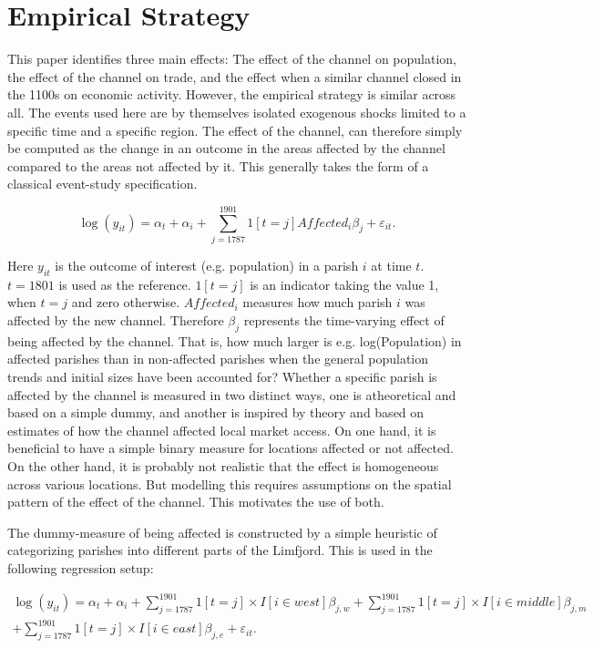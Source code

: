 \documentclass[11pt]{article}
\begin{document}
\section{Empirical Strategy}
This paper identifies three main effects: The effect of the channel on population, the effect of the channel on trade, and the effect when a similar channel closed in the 1100s on economic activity. However, the empirical strategy is similar across all. The events used here are by themselves isolated exogenous shocks limited to a specific time and a specific region. The effect of the channel, can therefore simply be computed as the change in an outcome in the areas affected by the channel compared to the areas not affected by it. This generally takes the form of a classical event-study specification.

\begin{equation}
\label{eq:eq501}
\log(y_{it})= \alpha_t + \alpha_i + \sum_{j=1787}^{1901} 1[t=j]Affected_{i}\beta_{j} + \varepsilon_{it}.
\end{equation}

Here $y_{it}$ is the outcome of interest (e.g. population) in a parish $i$ at time $t$. $t=1801$ is used as the reference. $1[t=j]$ is an indicator taking the value 1, when $t=j$ and zero otherwise. $Affected_{i}$ measures how much parish $i$ was affected by the new channel. Therefore $\beta_j$ represents the time-varying effect of being affected by the channel. That is, how much larger is e.g. log(Population) in affected parishes than in non-affected parishes when the general population trends and initial sizes have been accounted for? Whether a specific parish is affected by the channel is measured in two distinct ways, one is atheoretical and based on a simple dummy, and another is inspired by theory and based on estimates of how the channel affected local market access. On one hand, it is beneficial to have a simple binary measure for locations affected or not affected. On the other hand, it is probably not realistic that the effect is homogeneous across various locations. But modelling this requires assumptions on the spatial pattern of the effect of the channel. This motivates the use of both.

The dummy-measure of being affected is constructed by a simple heuristic of categorizing parishes into different parts of the Limfjord. This is used in the following regression setup: 

\begin{equation}
\label{eq:eq502}
\begin{split}
\log(y_{it})= \alpha_t + \alpha_i + \sum_{j=1787}^{1901} 1[t=j] \times I[i\in west]\beta_{j,w} + \sum_{j=1787}^{1901} 1[t=j] \times I[i\in middle]\beta_{j,m} \\
+ \sum_{j=1787}^{1901} 1[t=j] \times I[i\in east]\beta_{j,e} + \varepsilon_{it}.
\end{split}
\end{equation}
\end{document}
